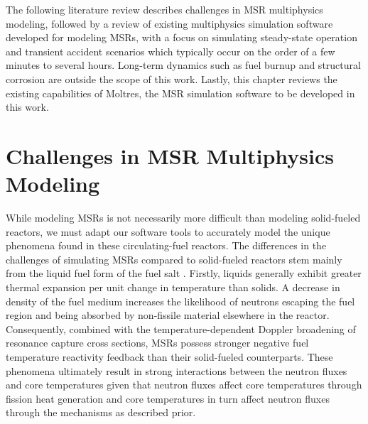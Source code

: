 The following literature review describes challenges in \gls{MSR} multiphysics
modeling, followed by a review of existing multiphysics simulation software
developed for modeling \glspl{MSR}, with a focus on simulating steady-state
operation and transient
accident scenarios which typically occur on the order of a few minutes to
several hours. Long-term dynamics such as fuel burnup and structural corrosion
are outside the scope of this work. Lastly, this chapter reviews the existing
capabilities of Moltres, the MSR simulation software to be developed in this
work.

\section{Challenges in \gls{MSR} Multiphysics Modeling}

While modeling \glspl{MSR} is not necessarily more difficult than modeling
solid-fueled reactors, we must adapt our software tools to accurately model the
unique phenomena found in these circulating-fuel reactors. The differences in
the challenges of simulating \glspl{MSR} compared to solid-fueled reactors stem
mainly from the liquid fuel form of the fuel salt \cite{huff_identifying_2019,
diamond_phenomena_2018}. Firstly, liquids generally exhibit greater thermal
expansion per unit change in temperature than solids. A decrease in density of
the fuel medium increases the likelihood of neutrons escaping the fuel region
and being absorbed by non-fissile material elsewhere in the reactor.
Consequently, combined with the temperature-dependent Doppler broadening of
resonance capture cross sections, \glspl{MSR} possess stronger negative fuel
temperature reactivity feedback than their solid-fueled counterparts. These
phenomena ultimately result in strong interactions between the neutron fluxes
and core temperatures given that neutron fluxes affect core temperatures
through fission heat generation and core temperatures in turn affect neutron
fluxes through the mechanisms as described prior.

